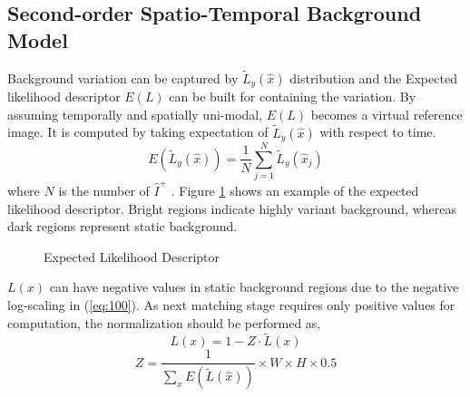 \documentclass[conference]{IEEEtran}
\begin{document}
\subsection{Second-order Spatio-Temporal Background Model}
Background variation can be captured by \begin{math} \tilde{L}_y(\hat{x}) \end{math}  distribution and the Expected likelihood descriptor \begin{math} E(L) \end{math} can be built for containing the variation. By assuming temporally and spatially uni-modal, \begin{math} E(L) \end{math} becomes a virtual reference image. It is computed by taking expectation of \begin{math} \tilde{L}_y(\hat{x}) \end{math} with respect to time. 
\begin{equation}\label{eq:130}
  E(\tilde{L}_y(\hat{x})) = \frac{1}{N} \sum_{j=1}^N \tilde{L}_y(\hat{x}_j)
\end{equation}
where \begin{math} N \end{math} is the number of \begin{math} \hat{I}^+ \end{math} . Figure \ref{fig:70} shows an example of the expected likelihood descriptor. Bright regions indicate highly variant background, whereas dark regions represent static background.

\begin{figure}[!t]
  \centering
  \label{fig:70}
  \hfill
  \hfill
  \caption{Expected Likelihood Descriptor}
\end{figure}
\begin{math} L(x) \end{math} can have negative values in static background regions due to the negative log-scaling in (\ref{eq:100}). As next matching stage requires only positive values for computation, the normalization should be performed as,
\begin{equation}\label{eq:140}
  L(x) = 1 - Z \cdot \tilde{L}(x)
\end{equation}
\begin{equation}\label{eq:150}
  Z = \frac{1}{ \sum_x E( \tilde{L}(\hat{x}) ) } \times W \times H \times 0.5
\end{equation}
\end{document}
